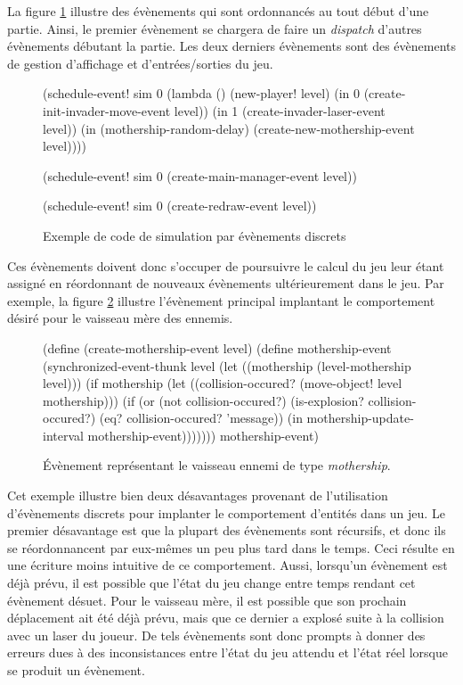 \documentclass[12pt,twoside,letterpaper,francais]{book}
\begin{document}
La figure \ref{Exp:des} illustre des évènements qui sont ordonnancés
au tout début d'une partie. Ainsi, le premier évènement se chargera de
faire un \textit{dispatch} d'autres évènements débutant la partie. Les
deux derniers évènements sont des évènements de gestion d'affichage et
d'entrées/sorties du jeu.\\

\begin{figure}[htb!]
  \begin{schemecode}
(schedule-event! sim 0
  (lambda () (new-player! level)
             (in 0 (create-init-invader-move-event level))
             (in 1 (create-invader-laser-event level))
             (in (mothership-random-delay)
                 (create-new-mothership-event level))))
 
(schedule-event! sim 0 (create-main-manager-event level))

(schedule-event! sim 0 (create-redraw-event level))
  \end{schemecode}
  \caption{Exemple de code de simulation par évènements discrets}
  \label{Exp:des}
\end{figure}

Ces évènements doivent donc s'occuper de poursuivre le calcul du jeu
leur étant assigné en réordonnant de nouveaux évènements
ultérieurement dans le jeu. Par exemple, la figure \ref{Exp:mother-ev}
illustre l'évènement principal implantant le comportement désiré pour
le vaisseau mère des ennemis.\\

\begin{figure}[htb!]
  \begin{schemecode}
(define (create-mothership-event level)
 (define mothership-event
   (synchronized-event-thunk level
     (let ((mothership (level-mothership level)))
       (if mothership
           (let ((collision-occured? (move-object! level mothership)))
             (if (or (not collision-occured?)
                     (is-explosion? collision-occured?)
                     (eq? collision-occured? 'message))
                 (in mothership-update-interval mothership-event)))))))
  mothership-event)
  \end{schemecode}
  \caption{Évènement représentant le vaisseau ennemi de type
    \textit{mothership}.}
  \label{Exp:mother-ev}
\end{figure}

Cet exemple illustre bien deux désavantages provenant de l'utilisation
d'évènements discrets pour implanter le comportement d'entités dans un
jeu. Le premier désavantage est que la plupart des évènements sont
récursifs, et donc ils se réordonnancent par eux-mêmes un peu plus
tard dans le temps. Ceci résulte en une écriture moins intuitive de ce
comportement. Aussi, lorsqu'un évènement est déjà prévu, il est
possible que l'état du jeu change entre temps rendant cet évènement
désuet. Pour le vaisseau mère, il est possible que son prochain
déplacement ait été déjà prévu, mais que ce dernier a explosé suite à
la collision avec un laser du joueur. De tels évènements sont donc
prompts à donner des erreurs dues à des inconsistances entre l'état du
jeu attendu et l'état réel lorsque se produit un évènement.
\end{document}
